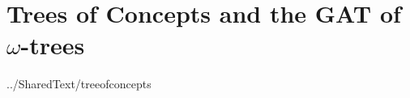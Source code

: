 \documentclass[10pt,a4paper]{article}
\begin{document}
\iffalse
A citizen in the context of a triangle is written as:
$$
triangle \cross citizen
$$
and since a citizen needs a country for context:
$$
country \base citizen
$$
 therefore $triangle \cross citizen$ requires $triangle \cross country$:
$$ triangle \cross country \base triangle \cross citizen$$.


One citizen in the context of another, when written as:
$$citizen \cross citizen$$
is ambiguous and is therefore written instead as:
$$citizen \cross_{country} citizen$$
if we imagine a citizen of the same country or is written as as
$$citizen \cross_1 citizen$$
if we imagine absolutely any other citizen of any country whatsoever, 
where $1$ represents \textit{the absolute}. 

Particularisation of  citizen to instance france of country is written as
$france^*citizen$.
\fi

\section{Trees of Concepts and the GAT of $\omega$-trees}
 {../SharedText/treeofconcepts}



\end{document}

